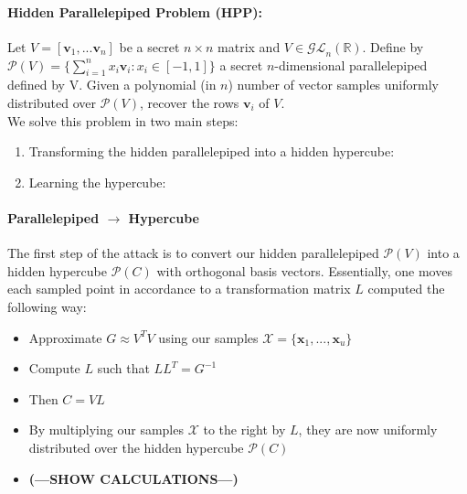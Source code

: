 \paragraph{Hidden Parallelepiped Problem (HPP):} Let $\mathit{V} = [\mathbf{v}_1, ... \mathbf{v}_n ]$ be a secret $n \times n$ matrix and $\mathit{V} \in \mathcal{GL}_n (\mathbb{R})$.
Define by $\mathcal{P}(\mathit{V}) = \{\sum_{i=1}^{n} x_i \mathbf{v}_i : x_i \in [-1, 1]\}$ a secret $n$-dimensional parallelepiped defined by V.
Given a polynomial (in $n$) number of vector samples uniformly distributed over $\mathcal{P}(\mathit{V})$, recover the rows $\mathbf{v}_i$ of $\mathit{V}$. \\
We solve this problem in two main steps: 
\begin{enumerate}
    \item Transforming the hidden parallelepiped into a hidden hypercube:
    \item Learning the hypercube:
\end{enumerate}
\paragraph{Parallelepiped $\rightarrow$ Hypercube}
The first step of the attack is to convert our hidden parallelepiped $\mathcal{P}(\mathit{V})$ into a hidden hypercube 
$\mathcal{P}(\mathit{C})$ with orthogonal basis vectors.
Essentially, one moves each sampled point in accordance to a transformation matrix $\mathit{L}$ computed the following way: \\
\begin{itemize}
    \item Approximate $\mathit{G} \approx \mathit{V}^T \mathit{V}$ using our samples $\mathcal{X} = \{\mathbf{x}_1, ..., \mathbf{x}_u\}$
    \item Compute $\mathit{L}$ such that $\mathit{L} \mathit{L}^{T} = \mathit{G}^{-1}$
    \item Then $\mathit{C} = \mathit{V} \mathit{L}$
    \item By multiplying our samples $\mathcal{X}$ to the right by $\mathit{L}$, they are now uniformly distributed over the hidden hypercube $\mathcal{P}(\mathit{C})$
    \item \textbf{(---SHOW CALCULATIONS---)}
\end{itemize}

